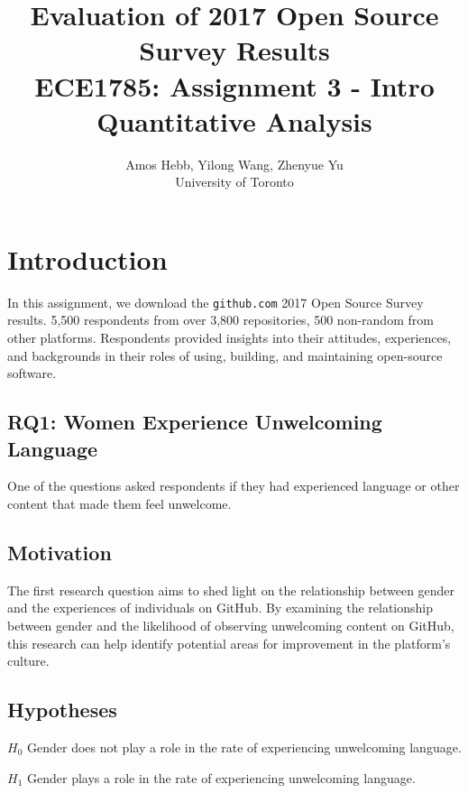 \documentclass[journal,12pt,onecolumn,]{IEEEtran}
\begin{document}
\title{Evaluation of 2017 Open Source Survey Results \\
{\normalsize ECE1785: Assignment 3 - Intro Quantitative Analysis}}

\author{Amos Hebb, Yilong Wang, Zhenyue Yu\\ \small University of Toronto}

\maketitle

\section{Introduction}

In this assignment, we download the \texttt{github.com} 2017 Open Source Survey results.
5,500 respondents from over 3,800 repositories, 500 non-random from other platforms.
Respondents provided insights into their attitudes, experiences, and backgrounds in their roles of using, building, and maintaining open-source software.

\subsection{RQ1: Women Experience Unwelcoming Language}

One of the questions asked respondents if they had experienced language or other content that made them feel unwelcome.

\subsection{Motivation}

The first research question aims to shed light on the relationship between gender and the experiences of individuals on GitHub.
By examining the relationship between gender and the likelihood of observing unwelcoming content on GitHub,
this research can help identify potential areas for improvement in the platform's culture.

\subsection{Hypotheses}

$H_0$ Gender does not play a role in the rate of experiencing unwelcoming language.

$H_1$ Gender plays a role in the rate of experiencing unwelcoming language.
\end{document}

